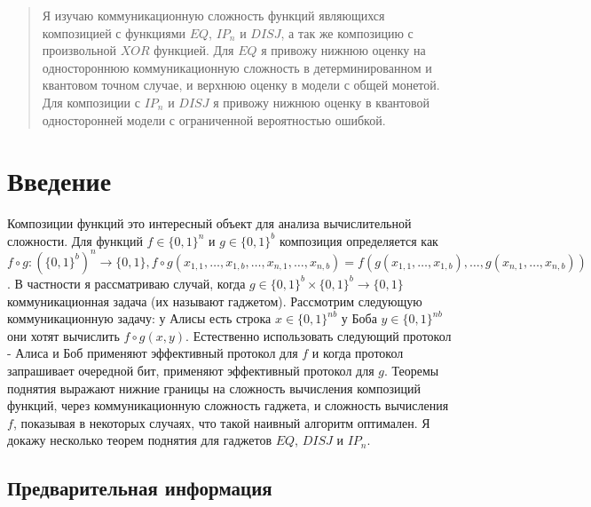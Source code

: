 \documentclass{article}
\begin{document}
\makeTitlePage

\tableofcontents

\begin{abstract}
Я изучаю коммуникационную сложность функций являющихся композицией с функциями $EQ$, $IP_n$ и $DISJ$, а так же композицию с произвольной $XOR$ функцией. Для $EQ$ я привожу нижнюю оценку на одностороннюю коммуникационную сложность в детерминированном и квантовом точном случае, и верхнюю оценку в модели с общей монетой. Для композиции с $IP_n$ и $DISJ$ я привожу нижнюю оценку в квантовой односторонней модели с ограниченной вероятностью ошибкой.     
\end{abstract}

\section{Введение}
Композиции функций это интересный объект для анализа вычислительной сложности. Для функций $f \in \{0, 1\}^n$ и $g \in \{0, 1\}^b$ композиция определяется как $f \circ g :(\{0, 1\}^b)^n \to \{0, 1\}, f \circ g(x_{1, 1}, \ldots, x_{1, b}, \ldots, x_{n, 1}, \ldots, x_{n, b}) = f(g(x_{1, 1}, \ldots, x_{1, b}), \ldots, g(x_{n, 1}, \ldots, x_{n, b}))$. В частности я рассматриваю случай, когда $g \in \{0, 1\}^b \times \{0, 1\}^b \to \{0, 1\}$ коммуникационная задача (их называют гаджетом). Рассмотрим следующую коммуникационную задачу: у Алисы есть строка $x \in \{0, 1\}^{nb}$ у Боба $y \in \{0, 1\}^{nb}$ они хотят вычислить $f \circ g (x, y)$. Естественно использовать следующий протокол - Алиса и Боб применяют эффективный протокол для $f$ и когда протокол запрашивает очередной бит, применяют эффективный протокол для $g$. Теоремы поднятия выражают нижние границы на сложность вычисления композиций функций, через коммуникационную сложность гаджета, и сложность вычисления $f$, показывая в некоторых случаях, что такой наивный алгоритм оптимален. Я докажу несколько теорем поднятия для гаджетов $EQ$, $DISJ$ и $IP_n$. 
\subsection{Предварительная информация}
\end{document}
